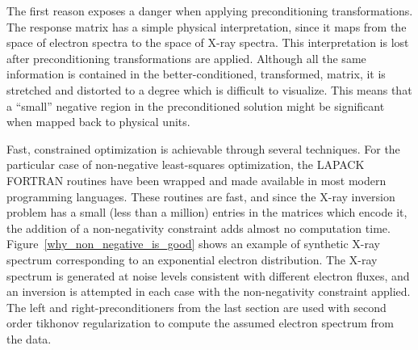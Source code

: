 The first reason exposes a danger when applying preconditioning transformations. The response matrix has a simple physical interpretation, since it maps from the space of electron spectra to the space of X-ray spectra. This interpretation is lost after preconditioning transformations are applied. Although all the same information is contained in the better-conditioned, transformed, matrix, it is stretched and distorted to a degree which is difficult to visualize. This means that a ``small'' negative region in the preconditioned solution might be significant when mapped back to physical units. 

Fast, constrained optimization is achievable through several techniques. For the particular case of non-negative least-squares optimization, the LAPACK FORTRAN routines have been wrapped and made available in most modern programming languages. These routines are fast, and since the X-ray inversion problem has a small (less than a million) entries in the matrices which encode it, the addition of a non-negativity constraint adds almost no computation time. 
Figure~\ref{why_non_negative_is_good} shows an example of synthetic X-ray spectrum corresponding to an exponential electron distribution. The X-ray spectrum is generated at noise levels consistent with different electron fluxes, and an inversion is attempted in each case with the non-negativity constraint applied. The left and right-preconditioners from the last section are used with second order tikhonov regularization to compute the assumed electron spectrum from the data. 

